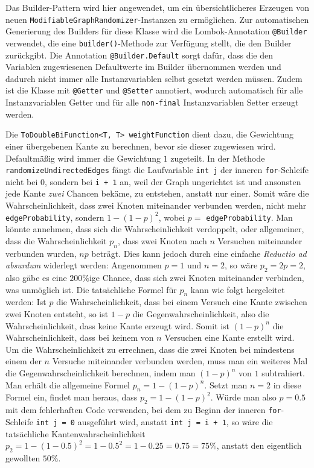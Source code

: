             Das Builder-Pattern wird hier angewendet, um ein übersichtlicheres Erzeugen von neuen \lstinline{ModifiableGraphRandomizer}-Instanzen zu ermöglichen. Zur automatischen Generierung des Builders für diese Klasse wird die Lombok-Annotation \lstinline{@Builder} verwendet, die eine \lstinline{builder()}-Methode zur Verfügung stellt, die den Builder zurückgibt. Die Annotation \lstinline{@Builder.Default} sorgt dafür, dass die den Variablen zugewiesenen Defaultwerte im Builder übernommen werden und dadurch nicht immer alle Instanzvariablen selbst gesetzt werden müssen. Zudem ist die Klasse mit \lstinline{@Getter} und \lstinline{@Setter} annotiert, wodurch automatisch für alle Instanzvariablen Getter und für alle \lstinline{non-final} Instanzvariablen Setter erzeugt werden. \cite{EZ:Web44}

            Die \lstinline{ToDoubleBiFunction<T, T> weightFunction} dient dazu, die Gewichtung einer übergebenen Kante zu berechnen, bevor sie dieser zugewiesen wird. Defaultmäßig wird immer die Gewichtung $1$ zugeteilt. In der Methode \lstinline{randomizeUndirectedEdges} fängt die Laufvariable \lstinline{int j} der inneren \lstinline{for}-Schleife nicht bei $0$, sondern bei \lstinline{i + 1} an, weil der Graph ungerichtet ist und ansonsten jede Kante \textit{zwei} Chancen bekäme, zu entstehen, anstatt nur einer. Somit wäre die Wahrscheinlichkeit, dass zwei Knoten miteinander verbunden werden, nicht mehr \lstinline{edgeProbability}, sondern $1 - (1 - p)^2$, wobei $p =$ \lstinline{edgeProbability}. Man könnte annehmen, dass sich die Wahrscheinlichkeit verdoppelt, oder allgemeiner, dass die Wahrscheinlichkeit $p_n$, dass zwei Knoten nach $n$ Versuchen miteinander verbunden wurden, $np$ beträgt. Dies kann jedoch durch eine einfache \emph{Reductio ad absurdum} widerlegt werden: Angenommen $p = 1$ und $n = 2$, so wäre $p_2 = 2p = 2$, also gäbe es eine $200\%$ige Chance, dass sich zwei Knoten miteinander verbinden, was unmöglich ist. Die tatsächliche Formel für $p_n$ kann wie folgt hergeleitet werden: Ist $p$ die Wahrscheinlichkeit, dass bei einem Versuch eine Kante zwischen zwei Knoten entsteht, so ist $1 - p$ die Gegenwahrscheinlichkeit, also die Wahrscheinlichkeit, dass keine Kante erzeugt wird. Somit ist $(1 - p)^n$ die Wahrscheinlichkeit, dass bei keinem von $n$ Versuchen eine Kante erstellt wird. Um die Wahrscheinlichkeit zu errechnen, dass die zwei Knoten bei mindestens einem der $n$ Versuche miteinander verbunden werden, muss man ein weiteres Mal die Gegenwahrscheinlichkeit berechnen, indem man $(1 - p)^n$ von $1$ subtrahiert. Man erhält die allgemeine Formel $p_n = 1 - (1 - p)^n$. Setzt man $n = 2$ in diese Formel ein, findet man heraus, dass $p_2 = 1 - (1 - p)^2$. Würde man also \zb $p = 0.5$ mit dem fehlerhaften Code verwenden, bei dem zu Beginn der inneren \lstinline{for}-Schleife \lstinline{int j = 0} ausgeführt wird, anstatt \lstinline{int j = i + 1}, so wäre die tatsächliche Kantenwahrscheinlichkeit $p_2 = 1 - (1 - 0.5)^2 = 1 - 0.5^2 = 1 - 0.25 = 0.75 = 75 \%$, anstatt den eigentlich gewollten $50 \%$. \cite{EZ:Web38}

